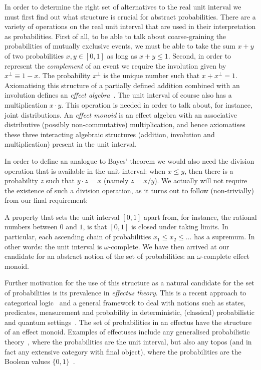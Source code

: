 \documentclass[10pt,conference]{IEEEtran}
\theoremstyle{definition}
\begin{document}
In order to determine the right set of alternatives to the real unit interval we must first find out what structure is crucial for abstract probabilities. There are a variety of operations on the real unit interval that are used in their interpretation as probabilities. First of all, to be able to talk about coarse-graining the probabilities of mutually exclusive events, we must be able to take the sum $x+y$ of two probabilities $x,y\in[0,1]$ as long as $x+y\leq 1$. Second, in order to represent the \emph{complement} of an event we require the involution given by $x^\perp \equiv 1-x$. The probability $x^\perp$ is the unique number such that $x+x^\perp = 1$. Axiomatising this structure of a partially defined addition combined with an involution defines an \emph{effect algebra}~\cite{foulis1994effect}.
The unit interval of course also has a multiplication $x\cdot y$. This operation is needed in order to talk about, for instance, joint distributions. 
An \emph{effect monoid} is an effect algebra with an associative distributive (possibly non-commutative) multiplication, and hence axiomatises these three interacting algebraic structures (addition, involution and multiplication) present in the unit interval.

In order to define an analogue to Bayes' theorem we would also need the division operation that is available in the unit interval: when $x\leq y$, then there is a probability $z$ such that $y\cdot z = x$ (namely $z=x/y$). We actually will not require the existence of such a division operation, as it turns out to follow (non-trivially) from our final requirement:

A property that sets the unit interval $[0,1]$ apart from, for instance, the rational numbers between $0$ and $1$, is that $[0,1]$ is closed under taking limits. In particular, each ascending chain of probabilities $x_1\leq x_2\leq \ldots$ has a supremum. In other words: the unit interval is $\omega$-complete.
We have then arrived at our candidate for an abstract notion of the set of probabilities: an $\omega$-complete effect monoid. 

Further motivation for the use of this structure as a natural candidate for the set of probabilities is its prevalence in \emph{effectus theory}.
This is a recent approach to categorical logic~\cite{cho2015introduction} and a general framework to deal with notions such as states, predicates, measurement and probability in deterministic, (classical) probabilistic and quantum settings~\cite{kentathesis,basthesis}.
The set of probabilities in an effectus have the structure of an effect monoid.
Examples of effectuses include any generalised probabilistic theory~\cite{barrett2007information}, where the probabilities are the unit interval, but also any topos (and in fact any extensive category with final object), where the probabilities are the Boolean values $\{0,1\}$~\cite{kentathesis}.
\end{document}
